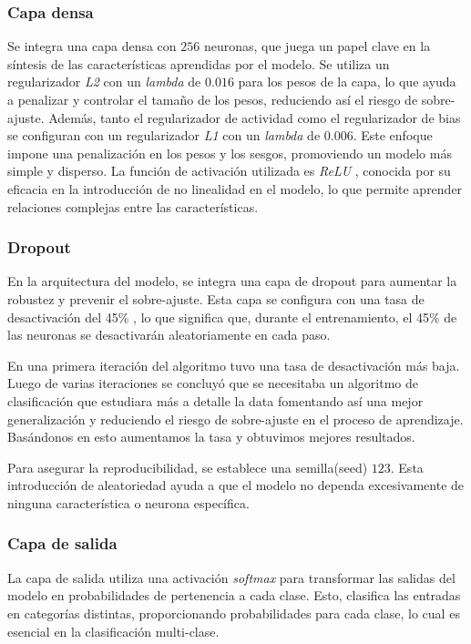 \subsubsection{Capa densa}

Se integra una capa densa con $256$ neuronas, que juega un papel clave en la síntesis de las características aprendidas por el modelo. Se utiliza un regularizador \textit{L2} con un \textit{lambda} de $0.016$ para los pesos de la capa, lo que ayuda a penalizar y controlar el tamaño de los pesos, reduciendo así el riesgo de sobre-ajuste. Además, tanto el regularizador de actividad como el regularizador de bias se configuran con un regularizador \textit{L1} con un \textit{lambda} de $0.006$. Este enfoque impone una penalización en los pesos y los sesgos, promoviendo un modelo más simple y disperso. La función de activación utilizada es \textit{ReLU} , conocida por su eficacia en la introducción de no linealidad en el modelo, lo que permite aprender relaciones complejas entre las características. 

\subsubsection{Dropout}

En la arquitectura del modelo, se integra una capa de dropout para aumentar la robustez y prevenir el sobre-ajuste. Esta capa se configura con una tasa de desactivación del 45\% , lo que significa que, durante el entrenamiento, el 45\% de las neuronas se desactivarán aleatoriamente en cada paso. 

En una primera iteración del algoritmo tuvo una tasa de desactivación más baja. Luego de varias iteraciones se concluyó que se necesitaba un algoritmo de clasificación que estudiara más a detalle la data fomentando así una mejor generalización y reduciendo el riesgo de sobre-ajuste en el proceso de aprendizaje. Basándonos en esto aumentamos la tasa y obtuvimos mejores resultados.

Para asegurar la reproducibilidad, se establece una semilla(seed) $123$. Esta introducción de aleatoriedad ayuda a que el modelo no dependa excesivamente de ninguna característica o neurona específica. 

\subsubsection{Capa de salida}

La capa de salida utiliza una activación \textit{softmax} para transformar las salidas del modelo en probabilidades de pertenencia a cada clase. Esto, clasifica las entradas en categorías distintas, proporcionando probabilidades para cada clase, lo cual es esencial en la clasificación multi-clase.

